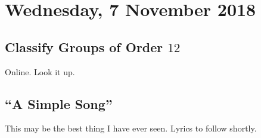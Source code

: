 \section{Wednesday, 7 November 2018}

\subsection{Classify Groups of Order \texorpdfstring{$12$}{12}}
Online. Look it up.

\subsection{``A Simple Song''}

This may be the best thing I have ever seen. Lyrics to follow shortly.

